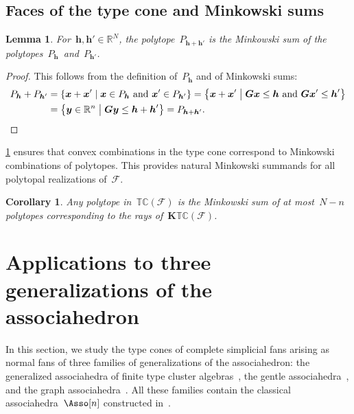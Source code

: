\documentclass{amsart}
\newtheorem{corollary}[theorem]{Corollary}
\newtheorem{lemma}[theorem]{Lemma}
\theoremstyle{definition}
\newcommand{\R}{\mathbb{R}} %
\renewcommand{\b}[1]{{\boldsymbol{#1}}} %
\newcommand{\set}[2]{\left\{ #1 \;\middle|\; #2 \right\}} %
\newcommand{\Fan}{\mathcal{F}} %
\newcommand{\typeCone}{\mathbb{TC}} %
\begin{document}
\subsection{Faces of the type cone and Minkowski sums}

\begin{lemma}
\label{lem:MinkowskiSum}
For~$\b{h}, \b{h}' \! \in \R^N$, the polytope~$P_{\b{h} + \b{h'}}$ is the Minkowski sum of the polytopes~$P_\b{h}$~and~$P_{\b{h}'}$.
\end{lemma}

\begin{proof}
This follows from the definition of~$P_\b{h}$ and of Minkowski sums:
\begin{align*}
P_\b{h} + P_{\b{h}'} & = \set{\b{x} + \b{x}'}{\b{x} \in P_\b{h} \text{ and } \b{x}' \in P_{\b{h}'}} = \set{\b{x} + \b{x}'}{\b{G}\b{x} \le \b{h} \text{ and } \b{G}\b{x}' \le \b{h}'} \\
& = \set{\b{y} \in \R^n}{\b{G}\b{y} \le \b{h} + \b{h}'} = P_{\b{h} + \b{h}'}.
\qedhere
\end{align*}
\end{proof}

\cref{lem:MinkowskiSum} ensures that convex combinations in the type cone correspond to Minkowski combinations of polytopes. This provides natural Minkowski summands for all polytopal realizations of~$\Fan$.

\begin{corollary}
Any polytope in~$\typeCone(\Fan)$ is the Minkowski sum of at most~$N-n$ polytopes corresponding to the rays of~$\b{K}\typeCone(\Fan)$.
\end{corollary}


\section{Applications to three generalizations of the associahedron}
\label{sec:applications}

In this section, we study the type cones of complete simplicial fans arising as normal fans of three families of generalizations of the associahedron: the generalized associahedra of finite type cluster algebras~\cite{FominZelevinsky-ClusterAlgebrasI, FominZelevinsky-ClusterAlgebrasII, FominZelevinsky-ClusterAlgebrasIV, HohlwegLangeThomas, HohlwegPilaudStella}, the gentle associahedra~\cite{PaluPilaudPlamondon-nonkissing}, and the graph associahedra~\cite{CarrDevadoss, Postnikov, FeichtnerSturmfels, Zelevinsky}. 
All these families contain the classical associahedra~$\Asso[n]$ constructed in~\cite{ShniderSternberg, Loday}.
\end{document}
